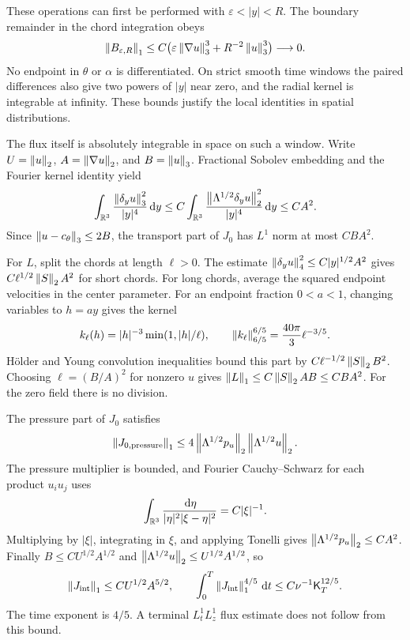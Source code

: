 These operations can first be performed with
\(\varepsilon<|y|<R\). The boundary remainder in the chord integration
obeys
\[
 \left\lVert B_{\varepsilon,R}\right\rVert_1
 \le C\bigl(\varepsilon\left\lVert \nabla u\right\rVert_3^3
                 +R^{-2}\left\lVert u\right\rVert_3^3\bigr)\longrightarrow0.
\]
No endpoint in \(\theta\) or \(\alpha\) is differentiated.
On strict smooth time windows the paired differences also give two
powers of \(|y|\) near zero, and the radial kernel is integrable at
infinity. These bounds justify the local identities in spatial
distributions.

The flux itself is absolutely integrable in space on such a window.
Write \(U=\left\lVert u\right\rVert_2\), \(A=\left\lVert \nabla u\right\rVert_2\), and \(B=\left\lVert u\right\rVert_3\).
Fractional Sobolev embedding and the Fourier kernel identity yield
\[
 \int_{\mathbb R^3}\frac{\left\lVert \delta_yu\right\rVert_3^2}{|y|^4}\,\mathrm d y
 \le C\int_{\mathbb R^3}
 \frac{\left\lVert \Lambda^{1/2}\delta_yu\right\rVert_2^2}{|y|^4}\,\mathrm d y
 \le CA^2.
\]
Since \(\left\lVert u-c_\theta\right\rVert_3\le2B\), the transport part of \(J_0\)
has \(L^1\) norm at most \(CBA^2\).

For \(L\), split the chords at length \(\ell>0\).
The estimate
\(\left\lVert \delta_yu\right\rVert_4^2\le C|y|^{1/2}A^2\) gives
\(C\ell^{1/2}\left\lVert S\right\rVert_2A^2\) for short chords.
For long chords, average the squared endpoint velocities in the center
parameter. For an endpoint fraction \(0<a<1\), changing variables to
\(h=ay\) gives the kernel
\[
 k_\ell(h)=|h|^{-3}\min(1,|h|/\ell),\qquad
 \left\lVert k_\ell\right\rVert_{6/5}^{6/5}=\frac{40\pi}{3}\ell^{-3/5}.
\]
H\"older and Young convolution inequalities bound this part by
\(C\ell^{-1/2}\left\lVert S\right\rVert_2B^2\).
Choosing \(\ell=(B/A)^2\) for nonzero \(u\) gives
\(\left\lVert L\right\rVert_1\le C\left\lVert S\right\rVert_2AB\le CBA^2\).
For the zero field there is no division.

The pressure part of \(J_0\) satisfies
\[
 \left\lVert J_{0,\mathrm{pressure}}\right\rVert_1
 \le4\left\lVert \Lambda^{1/2}p_u\right\rVert_2\left\lVert \Lambda^{1/2}u\right\rVert_2.
\]
The pressure multiplier is bounded, and Fourier Cauchy--Schwarz for
each product \(u_i u_j\) uses
\[
 \int_{\mathbb R^3}\frac{\,\mathrm d\eta}{|\eta|^2|\xi-\eta|^2}
 =C|\xi|^{-1}.
\]
Multiplying by \(|\xi|\), integrating in \(\xi\), and applying Tonelli
gives \(\left\lVert \Lambda^{1/2}p_u\right\rVert_2\le CA^2\).
Finally \(B\le CU^{1/2}A^{1/2}\) and
\(\left\lVert \Lambda^{1/2}u\right\rVert_2\le U^{1/2}A^{1/2}\), so
\begin{equation}
 \left\lVert J_{\mathrm{int}}\right\rVert_1\le CU^{1/2}A^{5/2},\qquad
 \int_0^T\left\lVert J_{\mathrm{int}}\right\rVert_1^{4/5}\,\mathrm d t
 \le C\nu^{-1}\mathsf K_T^{12/5}.
 \label{r:crd-eq:flux-budget}
\end{equation}
The time exponent is \(4/5\). A terminal \(L^1_tL^1_z\) flux estimate
does not follow from this bound.

